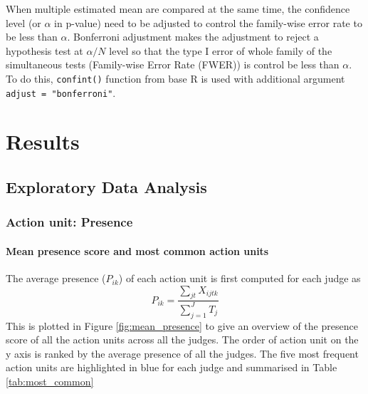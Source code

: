 \documentclass{monashthesis}
\begin{document}
When multiple estimated mean are compared at the same time, the confidence level (or \(\alpha\) in p-value) need to be adjusted to control the family-wise error rate to be less than \(\alpha\). Bonferroni adjustment makes the adjustment to reject a hypothesis test at \(\alpha/N\) level so that the type I error of whole family of the simultaneous tests (Family-wise Error Rate (FWER)) is control be less than \(\alpha\). To do this, \texttt{confint()} function from base R is used with additional argument \texttt{adjust\ =\ "bonferroni"}.

\hypertarget{results}{%
\chapter{Results}\label{results}}

\hypertarget{exploratory-data-analysis}{%
\section{Exploratory Data Analysis}\label{exploratory-data-analysis}}

\hypertarget{action-unit-presence}{%
\subsection{Action unit: Presence}\label{action-unit-presence}}

\hypertarget{mean-presence-score-and-most-common-action-units}{%
\subsubsection{Mean presence score and most common action units}\label{mean-presence-score-and-most-common-action-units}}

The average presence (\(P_{ik}\)) of each action unit is first computed for each judge as \[P_{ik} = \frac{\sum_{jt}X_{ijtk}}{\sum_{j = 1}^JT_j}\] This is plotted in Figure \ref{fig:mean_presence} to give an overview of the presence score of all the action units across all the judges. The order of action unit on the y axis is ranked by the average presence of all the judges. The five most frequent action units are highlighted in blue for each judge and summarised in Table \ref{tab:most_common}
\end{document}
